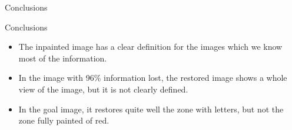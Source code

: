 \documentclass[11pt]{beamer}
\begin{document}
\begin{frame}{Conclusions}
\begin{block}{Conclusions}
\begin{itemize}
\item The inpainted image has a clear definition for the images which we know most of the information.
\item In the image with 96\% information lost, the restored image shows a whole view of the image, but it is not clearly defined.
\item In the goal image, it restores quite well the zone with letters, but not the zone fully painted of red.
\end{itemize}

\end{block}
\end{frame}
\end{document}
